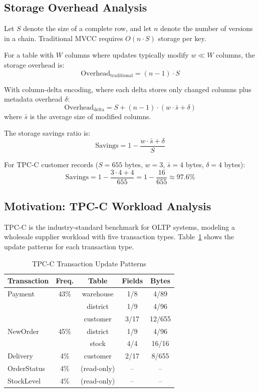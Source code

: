 \documentclass[letterpaper,twocolumn,10pt]{article}
\begin{document}
\subsection{Storage Overhead Analysis}

Let $S$ denote the size of a complete row, and let $n$ denote the number of versions in a chain. Traditional MVCC requires $O(n \cdot S)$ storage per key.

For a table with $W$ columns where updates typically modify $w \ll W$ columns, the storage overhead is:
\[
\text{Overhead}_{\text{traditional}} = (n-1) \cdot S
\]

With column-delta encoding, where each delta stores only changed columns plus metadata overhead $\delta$:
\[
\text{Overhead}_{\text{delta}} = S + (n-1) \cdot (w \cdot \bar{s} + \delta)
\]
where $\bar{s}$ is the average size of modified columns.

The storage savings ratio is:
\[
\text{Savings} = 1 - \frac{w \cdot \bar{s} + \delta}{S}
\]

For TPC-C customer records ($S = 655$ bytes, $w = 3$, $\bar{s} = 4$ bytes, $\delta = 4$ bytes):
\[
\text{Savings} = 1 - \frac{3 \cdot 4 + 4}{655} = 1 - \frac{16}{655} \approx 97.6\%
\]

\subsection{Motivation: TPC-C Workload Analysis}

TPC-C is the industry-standard benchmark for OLTP systems, modeling a wholesale supplier workload with five transaction types. Table~\ref{tab:tpcc-analysis} shows the update patterns for each transaction type.

\begin{table}[t]
\centering
\caption{TPC-C Transaction Update Patterns}
\label{tab:tpcc-analysis}
\begin{tabular}{lcccc}
\toprule
Transaction & Freq. & Table & Fields & Bytes \\
\midrule
Payment & 43\% & warehouse & 1/8 & 4/89 \\
        &      & district & 1/9 & 4/96 \\
        &      & customer & 3/17 & 12/655 \\
\midrule
NewOrder & 45\% & district & 1/9 & 4/96 \\
         &      & stock & 4/4 & 16/16 \\
\midrule
Delivery & 4\% & customer & 2/17 & 8/655 \\
\midrule
OrderStatus & 4\% & (read-only) & -- & -- \\
StockLevel & 4\% & (read-only) & -- & -- \\
\bottomrule
\end{tabular}
\end{table}
\end{document}
